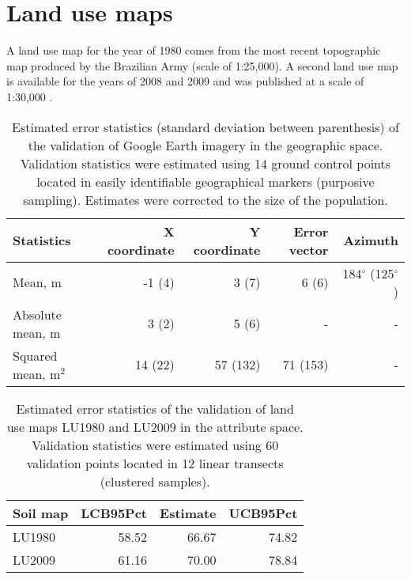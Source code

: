 \tocless\section{Land use maps}
\label{sec:covar-data-land-use}

A land use map for the year of 1980 comes from the most recent topographic map produced by the Brazilian Army (scale of 1:25,000). A second land use map is available for the years of 2008 and 2009 and was published at a scale of 1:30,000 \cite{SamuelRosaEtAl2011a}.

\begin{table}[ht]
\caption{Estimated error statistics (standard deviation between parenthesis) of the validation of Google Earth imagery in the geographic space. Validation statistics were estimated using 14 ground control points located in easily identifiable geographical markers (purposive sampling). Estimates were corrected to the size of the population.}
\label{tab:google-geo-val}
\centering
{\small
\begin{tabular}{lrrrr}
\hline
Statistics           & X coordinate & Y coordinate & Error vector  & Azimuth                   \\
\hline
Mean, m              & -1 (4)       & 3  (7)       & 6  (6)        & 184$^\circ$ (125$^\circ$) \\ 
Absolute mean, m     & 3  (2)       & 5  (6)       & -             & -                         \\ 
Squared mean, m$^2$  & 14 (22)      & 57 (132)     & 71 (153)      & -                         \\ 
\hline
\end{tabular}}
\end{table}

\begin{table}[ht]
\caption{Estimated error statistics of the validation of land use maps LU1980 and LU2009 in the attribute space. Validation statistics were estimated using 60 validation points located in 12 linear transects (clustered samples).}
\label{tab:land-attr-val}
\centering
{\small
\begin{tabular}{lrrr}
\hline
Soil map     & LCB95Pct & Estimate & UCB95Pct \\
\hline
LU1980       & 58.52    & 66.67    & 74.82    \\
LU2009       & 61.16    & 70.00    & 78.84    \\
\hline
\end{tabular}}
\end{table}


